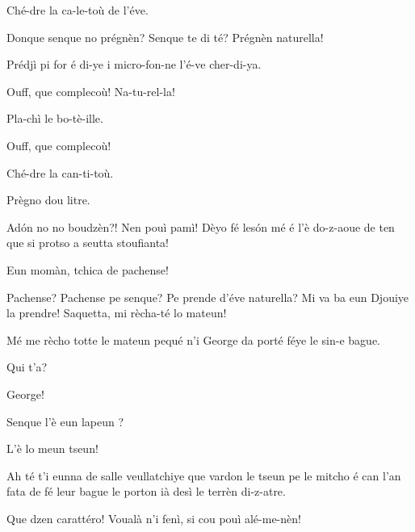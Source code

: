 \begin{drama}
\Machinaspeaks {} Ché-dre la ca-le-toù de l’éve.

\Claudinespeaks{} Donque senque no prégnèn? Senque te di té? Prégnèn naturella!


\Machinaspeaks {} Prédjì pi for é di-ye i micro-fon-ne l’é-ve cher-di-ya.

\Claudinespeaks Ouff, que complecoù!  Na-tu-rel-la!


\Machinaspeaks Pla-chì le bo-tè-ille.

\Claudinespeaks Ouff, que complecoù!


\Machinaspeaks Ché-dre la can-ti-toù.

\Claudinespeaks Prègno dou litre. 

\Giacospeaks{} Ad\'on no no boudzèn?! Nen pouì pamì! Dèyo fé les\'on mé é l'è do-z-aoue de ten que si protso  a seutta stoufianta!

\Claudinespeaks {} Eun momàn, tchica de pachense!

\Giacospeaks Pachense? Pachense pe senque? Pe prende d'éve naturella? Mi va ba eun Djouiye la prendre! Saquetta, mi rècha-té lo mateun! 

\Claudinespeaks{} Mé me rècho totte le mateun pequé n'i George da porté féye le sin-e bague\cacca .

\Giacospeaks Qui t'a?

\Claudinespeaks{} George!

\Giacospeaks Senque l'è eun lapeun \coniglio ?

\Claudinespeaks L'è lo meun tseun!

\Giacospeaks Ah té t'i eunna de salle veullatchiye que vardon le tseun pe le mitcho é can l’an fata de fé leur bague le porton ià desì le terrèn di-z-atre.

\Claudinespeaks Que dzen carattéro! Voualà n’i fenì, si cou pouì alé-me-nèn!


\end{drama}
